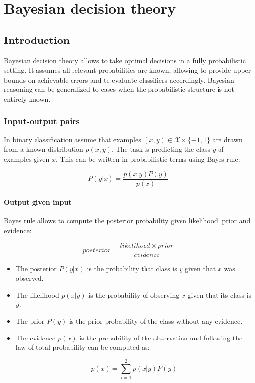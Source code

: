 \chapter{Bayesian decision theory}

\section{Introduction}
Bayesian decision theory allows to take optimal decisions in a fully probabilistic setting.
It assumes all relevant probabilities are known, allowing to provide upper bounds on achievable errors and to evaluate classifiers accordingly.
Bayesian reasoning can be generalized to cases when the probabilistic structure is not entirely known.

	\subsection{Input-output pairs}
	In binary classification assume that examples $(x,y)\in\mathcal{X}\times \{-1,1\}$ are drawn from a known distribution $p(x,y)$.
	The task is predicting the class $y$ of examples given $x$.
	This can be written in probabilistic terms using Bayes rule:

	$$P(y|x) = \frac{p(x|y)P(y)}{p(x)}$$

		\subsubsection{Output given input}
		Bayes rule allows to compute the posterior probability given likelihood, prior and evidence:

		$$posterior = \frac{likelihood\times prior}{evidence}$$

		\begin{multicols}{2}
			\begin{itemize}
				\item The posterior $P(y|x)$ is the probability that class is $y$ given that $x$ was observed.
				\item The likelihood $p(x|y)$ is the probability of observing $x$ given that its class is $y$.
				\item The prior $P(y)$ is the prior probability of the class without any evidence.
				\item The evidence $p(x)$ is the probability of the observation and following the law of total probability can be computed as:

					$$p(x) = \sum\limits_{i=1}^2 p(x|y)P(y)$$

			\end{itemize}
		\end{multicols}

